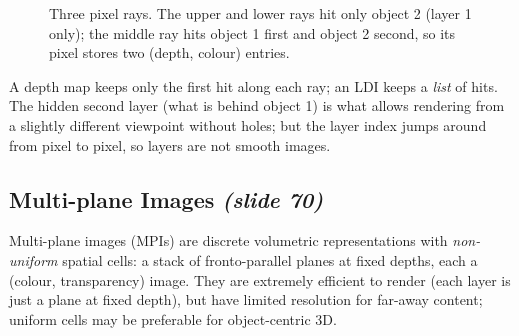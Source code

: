 \documentclass[11pt,a4paper]{article}
\theoremstyle{definition}
\theoremstyle{plain}
\theoremstyle{remark}
\newcommand{\slides}[1]{\texorpdfstring{\emph{(#1)}}{(#1)}}
\begin{document}
\begin{figure}[ht]
\centering
{}
\caption{Three pixel rays. The upper and lower rays hit only object 2 (layer 1 only); the middle ray hits object 1 first and object 2 second, so its pixel stores two (depth, colour) entries.}
\end{figure}

\begin{intuition}
A depth map keeps only the first hit along each ray; an LDI keeps a \emph{list} of hits. The hidden second layer (what is behind object 1) is what allows rendering from a slightly different viewpoint without holes; but the layer index jumps around from pixel to pixel, so layers are not smooth images.
\end{intuition}

\subsection{Multi-plane Images \slides{slide 70}}
Multi-plane images (MPIs) are discrete volumetric representations with \emph{non-uniform} spatial cells: a stack of fronto-parallel planes at fixed depths, each a (colour, transparency) image. They are extremely efficient to render (each layer is just a plane at fixed depth), but have limited resolution for far-away content; uniform cells may be preferable for object-centric 3D.
\end{document}
